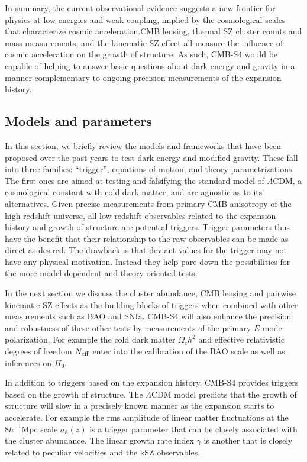 In summary, the current observational evidence suggests a new frontier for physics at low energies and weak coupling, implied by the cosmological scales that characterize cosmic acceleration.CMB lensing, thermal SZ cluster counts and mass measurements, and the kinematic SZ effect  all measure the influence of cosmic acceleration on the growth of 
structure.   As such, CMB-S4 would be capable of helping to answer basic questions about dark energy and gravity in a manner complementary to ongoing precision measurements of the expansion history.    %


\subsection{Models and parameters}
In this section, we  briefly review the models and frameworks that have been proposed over the past years to test dark energy and modified gravity.   These fall into 
three families: ``trigger'', equations of motion, and theory parametrizations. The first ones are aimed at testing and falsifying the standard model
of $\Lambda$CDM, a cosmological constant with cold dark matter, and are agnostic as to its 
alternatives.  Given precise measurements from primary CMB anisotropy of the high redshift universe, all low redshift observables related to the expansion history and growth of
structure are potential triggers.  Trigger parameters thus have the benefit that their relationship to the raw observables can be made as direct as desired.   The drawback is 
that deviant values for the trigger may not have any physical motivation.  Instead they help pare down the possibilities for the more model
dependent and theory oriented tests.  


  In the next section we discuss the cluster abundance,
 CMB lensing and pairwise kinematic SZ effects as the building blocks of triggers when
 combined with other measurements such as BAO and SNIa.   CMB-S4 will also enhance the precision and robustness
 of these other tests by measurements of the primary $E$-mode polarization.   For example
 the cold dark matter $\Omega_c h^2$ and effective relativistic degrees of freedom $N_{\rm eff}$ enter into the calibration of the BAO scale as well as inferences on $H_0$. 
 
In addition to triggers based on the expansion history, CMB-S4 provides triggers based
on the growth of structure.  The $\Lambda$CDM model predicts that the growth of structure
will slow in a precisely known manner as the expansion starts to accelerate.   
For example the rms amplitude of linear matter fluctuations at the $8 h^{-1}$Mpc
scale $\sigma_8(z)$ is a trigger parameter that can be closely associated with the 
cluster abundance.   The linear growth rate index $\gamma$ is another that is closely related
to peculiar velocities and the kSZ observables.   

